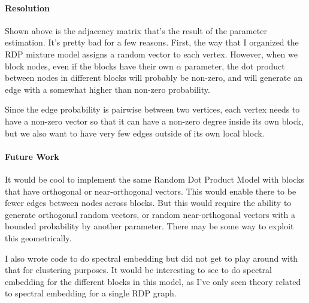 \documentclass[12pt]{article}
\begin{document}
\paragraph{Resolution}
Shown above is the adjacency matrix that's the result of the parameter
estimation.  It's pretty bad for a few reasons.  First, the way that I organized
the RDP mixture model assigns a random vector to each vertex.  However, when we
block nodes, even if the blocks have their own $\alpha$ parameter, the dot
product between nodes in different blocks will probably be non-zero, and will
generate an edge with a somewhat higher than non-zero probability.

Since the edge probability is pairwise between two vertices, each vertex needs
to have a non-zero vector so that it can have a non-zero degree inside its own
block, but we also want to have very few edges outside of its own local block.

\paragraph{Future Work}
It would be cool to implement the same Random Dot Product Model with blocks that
have orthogonal or near-orthogonal vectors.  This would enable there to be fewer
edges between nodes across blocks.  But this would require the ability to
generate orthogonal random vectors, or random near-orthogonal vectors with a
bounded probability by another parameter.  There may be some way to exploit this
geometrically.

I also wrote code to do spectral embedding but did not get to play around with
that for clustering purposes.  It would be interesting to see to do spectral
embedding for the different blocks in this model, as I've only seen theory
related to spectral embedding for a single RDP graph.

\newpage



\end{document}

